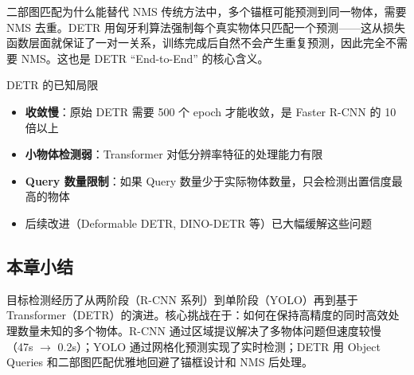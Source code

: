 \begin{importantbox}{二部图匹配为什么能替代 NMS}
传统方法中，多个锚框可能预测到同一物体，需要 NMS 去重。DETR 用匈牙利算法强制每个真实物体只匹配一个预测——这从损失函数层面就保证了一对一关系，训练完成后自然不会产生重复预测，因此完全不需要 NMS。这也是 DETR ``End-to-End'' 的核心含义。
\end{importantbox}

\begin{warningbox}{DETR 的已知局限}
\begin{itemize}
    \item \textbf{收敛慢}：原始 DETR 需要 500 个 epoch 才能收敛，是 Faster R-CNN 的 10 倍以上
    \item \textbf{小物体检测弱}：Transformer 对低分辨率特征的处理能力有限
    \item \textbf{Query 数量限制}：如果 Query 数量少于实际物体数量，只会检测出置信度最高的物体
    \item 后续改进（Deformable DETR, DINO-DETR 等）已大幅缓解这些问题
\end{itemize}
\end{warningbox}

\subsection{本章小结}

目标检测经历了从两阶段（R-CNN 系列）到单阶段（YOLO）再到基于 Transformer（DETR）的演进。核心挑战在于：如何在保持高精度的同时高效处理数量未知的多个物体。R-CNN 通过区域提议解决了多物体问题但速度较慢（47s $\rightarrow$ 0.2s）；YOLO 通过网格化预测实现了实时检测；DETR 用 Object Queries 和二部图匹配优雅地回避了锚框设计和 NMS 后处理。


